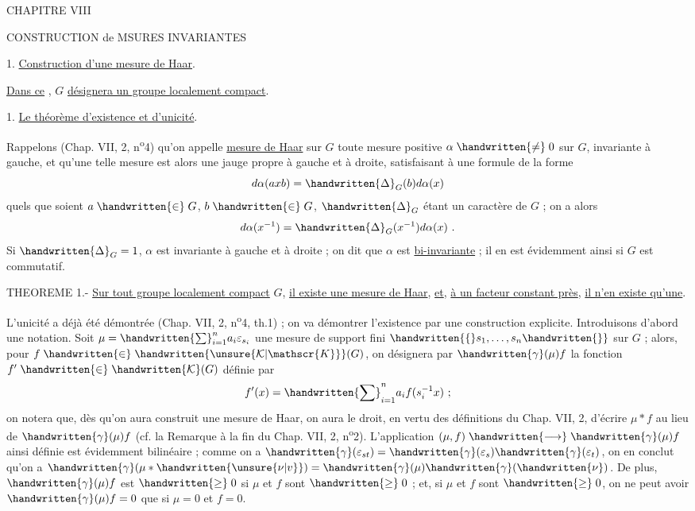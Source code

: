 CHAPITRE VIII

CONSTRUCTION de MSURES INVARIANTES

\handwritten{\S} 1. \uline{Construction d'une mesure de Haar}.

\uline{Dans ce} \handwritten{\S}, $G$ \uline{désignera un groupe localement compact}.

1. \uline{Le théorème d'existence et d'unicité}.

Rappelons (Chap. VII, \handwritten{\S} 2, n\textsuperscript{o}4) qu'on appelle \uline{mesure de Haar} sur $G$ toute mesure positive $\alpha\mathrel{\handwritten{\ne}}0$ sur $G$, invariante à gauche, et qu'une telle mesure est alors une jauge propre à gauche et à droite, satisfaisant à une formule de la forme
\[
d\alpha(axb)=\handwritten{\Delta}_G(b)d\alpha(x)
\]
quels que soient $a\mathrel{\handwritten{\in}}G$, $b\mathrel{\handwritten{\in}}G$, $\handwritten{\Delta}_G$ étant un caractère de $G$ ; on a alors
\[
d\alpha(x^{-1})=\handwritten{\Delta}_G(x^{-1})d\alpha(x)\ .
\]
Si $\handwritten{\Delta}_G=1$, $\alpha$ est invariante à gauche et à droite ; on dit que $\alpha$ est \uline{bi-invariante} ; il en est évidemment ainsi si $G$ est commutatif.

THEOREME 1.- \uline{Sur tout groupe localement compact} $G$, \uline{il existe une mesure de Haar}, \uline{et}, \uline{à un facteur constant près}, \uline{il n'en existe qu'une}.

L'unicité a déjà été démontrée (Chap. VII, \handwritten{\S} 2, n\textsuperscript{o}4, th.1) ; on va démontrer l'existence par une construction explicite. Introduisons d'abord une notation. Soit $\mu=\handwritten{\sum}_{i=1}^{n}a_i\varepsilon_{s_i}$ une mesure de support fini $\handwritten{\{}s_1,\ldots,s_n\handwritten{\}}$ sur $G$ ; alors, pour $f\mathrel{\handwritten{\in}}\handwritten{\unsure{\mathcal{K}|\mathscr{K}}}(G)$, on désignera par $\handwritten{\gamma}(\mu)f$ la fonction $f'\mathrel{\handwritten{\in}}\handwritten{\mathcal{K}}(G)$ définie par
\[
f'(x)=\handwritten{\sum}_{i=1}^{n}a_i f(s_i^{-1}x)\ ;
\]
on notera que, dès qu'on aura construit une mesure de Haar, on aura le droit, en vertu des définitions du Chap. VII, \handwritten{\S} 2, d'écrire $\mu\ast f$ au lieu de $\handwritten{\gamma}(\mu)f$ (cf. la Remarque à la fin du Chap. VII, \handwritten{\S} 2, n\textsuperscript{o}2). L'application $(\mu,f)\mathrel{\handwritten{\longrightarrow}}\handwritten{\gamma}(\mu)f$ ainsi définie est évidemment bilinéaire ; comme on a $\handwritten{\gamma}(\varepsilon_{st})=\handwritten{\gamma}(\varepsilon_s)\handwritten{\gamma}(\varepsilon_t)$, on en conclut qu'on a $\handwritten{\gamma}(\mu\ast\handwritten{\unsure{\nu|v}})=\handwritten{\gamma}(\mu)\handwritten{\gamma}(\handwritten{\nu})$. De plus, $\handwritten{\gamma}(\mu)f$ est $\mathrel{\handwritten{\geq}}0$ si $\mu$ et $f$ sont $\mathrel{\handwritten{\geq}}0$ ; et, si $\mu$ et $f$ sont $\mathrel{\handwritten{\geq}}0$, on ne peut avoir $\handwritten{\gamma}(\mu)f=0$ que si $\mu=0$ et $f=0$.

